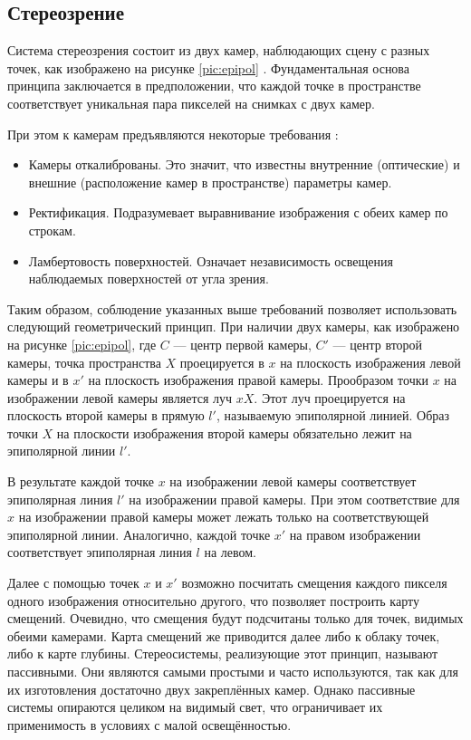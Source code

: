 
\subsection{Стереозрение}
\label{stereovision}
Система стереозрения состоит из двух камер, наблюдающих сцену с разных точек, как изображено на рисунке \ref{pic:epipol} \cite{Hartley2004}. 
Фундаментальная основа принципа заключается в предположении, что каждой точке в пространстве соответствует уникальная пара пикселей на снимках с двух камер.  

При этом к камерам предъявляются некоторые требования \cite{rusoverview}:   %
\begin{itemize}
	\item Камеры откалиброваны. Это значит, что известны внутренние (оптические) и внешние (расположение камер в пространстве) параметры камер. 
	\item Ректификация. Подразумевает выравнивание изображения с обеих камер по строкам.  %
	\item Ламбертовость поверхностей. Означает независимость освещения наблюдаемых поверхностей от угла зрения. 
\end{itemize}

Таким образом, соблюдение указанных выше требований позволяет использовать следующий геометрический принцип. При наличии двух камеры, как изображено 
на рисунке \ref{pic:epipol}, где $C$ — центр первой камеры, $C'$ — центр второй камеры, точка пространства $X$  
проецируется в $x$ на плоскость изображения левой камеры и в $x'$ на плоскость изображения правой камеры. Прообразом точки $x$ на изображении левой 
камеры является луч $xX$. Этот луч проецируется на плоскость второй камеры в прямую $l'$, называемую эпиполярной линией. Образ точки $X$ на плоскости 
изображения второй камеры обязательно лежит на эпиполярной линии $l'$.


В результате каждой точке $x$ на изображении левой камеры соответствует эпиполярная линия $l'$ на изображении правой камеры. При этом соответствие для $x$ на 
изображении правой камеры может лежать только на соответствующей эпиполярной линии. Аналогично, каждой точке $x'$ на правом изображении соответствует 
эпиполярная линия $l$ на левом. 


Далее с помощью точек $x$ и $x'$ возможно посчитать смещения каждого пикселя одного изображения относительно другого, что позволяет построить карту смещений. 
Очевидно, что смещения будут подсчитаны только для точек, видимых обеими камерами. Карта смещений же приводится далее либо к облаку точек, либо к карте глубины. 
Стереосистемы, реализующие этот принцип, называют пассивными. Они являются самыми простыми и часто используются, так как для их изготовления достаточно 
двух закреплённых камер. Однако пассивные системы опираются целиком на видимый свет, что ограничивает их применимость в условиях с малой освещённостью. %

